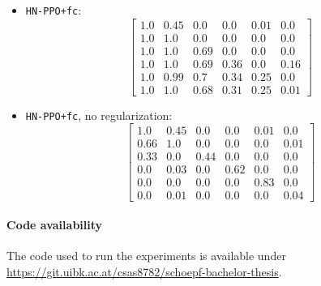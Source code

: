 \documentclass[dvipsnames]{article} %
\begin{document}
\begin{itemize}
\item \texttt{HN-PPO+fc}:
\[\left[\begin{array}{cccccc}
1.0& 0.45& 0.0& 0.0& 0.01& 0.0\\
1.0& 1.0& 0.0& 0.0& 0.0& 0.0\\
1.0& 1.0& 0.69& 0.0& 0.0& 0.0\\
1.0& 1.0& 0.69& 0.36& 0.0& 0.16\\
1.0& 0.99& 0.7& 0.34& 0.25& 0.0\\
1.0& 1.0& 0.68& 0.31& 0.25& 0.01
\end{array}\right]\]

\item \texttt{HN-PPO+fc}, no regularization:
\[\left[\begin{array}{cccccc}
1.0& 0.45& 0.0& 0.0& 0.01& 0.0\\
0.66& 1.0& 0.0& 0.0& 0.0& 0.01\\
0.33& 0.0& 0.44& 0.0& 0.0& 0.0\\
0.0& 0.03& 0.0& 0.62& 0.0& 0.0\\
0.0& 0.0& 0.0& 0.0& 0.83& 0.0\\
0.0& 0.01& 0.0& 0.0& 0.0& 0.04
\end{array}\right]\]
\end{itemize}

\paragraph{Code availability} The code used to run the experiments is available under \url{https://git.uibk.ac.at/csas8782/schoepf-bachelor-thesis}.
\end{document}
